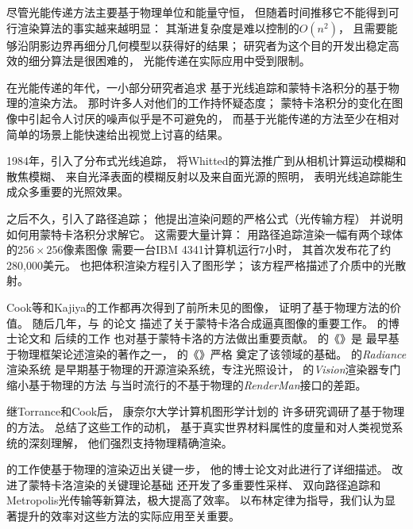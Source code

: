 尽管光能传递方法主要基于物理单位和能量守恒，
但随着时间推移它不能得到可行渲染算法的事实越来越明显：
其渐进复杂度是难以控制的$O(n^2)$，
且需要能够沿阴影边界再细分几何模型以获得好的结果；
研究者为这个目的开发出稳定高效的细分算法是很困难的，
光能传递在实际应用中受到限制。

在光能传递的年代，一小部分研究者追求
基于光线追踪和蒙特卡洛积分的基于物理的渲染方法。
那时许多人对他们的工作持怀疑态度；
蒙特卡洛积分的变化在图像中引起令人讨厌的噪声似乎是不可避免的，
而基于光能传递的方法至少在相对简单的场景上能快速给出视觉上讨喜的结果。

1984年，\citet{10.1145/800031.808590}引入了分布式光线追踪，
将Whitted的算法推广到从相机计算运动模糊和散焦模糊、
来自光泽表面的模糊反射以及来自面光源的照明，
表明光线追踪能生成众多重要的光照效果。

之后不久，\citet{10.1145/15922.15902}引入了路径追踪；
他提出渲染问题的严格公式（光传输方程）
并说明如何用蒙特卡洛积分求解它。
这需要大量计算：
用路径追踪渲染一幅有两个球体的$256\times256$像素图像
需要一台IBM 4341计算机运行7小时，
其首次发布花了约280,000美元\citep{farmer1981comparing}。
\citet{10.1145/800031.808594}
也把体积渲染方程引入了图形学；
该方程严格描述了介质中的光散射。

Cook等和Kajiya的工作都再次得到了前所未见的图像，
证明了基于物理方法的价值。
随后几年，\citet{10.1145/97879.97886}与
\citet{10.1145/122718.122735}的论文
描述了关于蒙特卡洛合成逼真图像的重要工作。
\citet{10.5555/124947}的博士论文和
后续\citet{10.1145/226150.226151}的工作
也对基于蒙特卡洛的方法做出重要贡献。
\citet{10.1007/978-1-4612-3526-2}的《》是
最早基于物理框架论述渲染的著作之一，
\citet{GLASSNER1995}的《》严格
奠定了该领域的基础。
\citet{10.1145/192161.192286}的\emph{Radiance}渲染系统
是早期基于物理的开源渲染系统，专注光照设计，
\citet{slusallek1996vision}的\emph{Vision}渲染器专门缩小基于物理的方法
与当时流行的不基于物理的\emph{RenderMan}接口的差距。

继Torrance和Cook后，
康奈尔大学计算机图形学计划的
许多研究调研了基于物理的方法。
\citet{10.1145/258734.258914}总结了这些工作的动机，
基于真实世界材料属性的度量和对人类视觉系统的深刻理解，
他们强烈支持物理精确渲染。

\citet{veach1997robust}的工作使基于物理的渲染迈出关键一步，
他的博士论文对此进行了详细描述。
\citeauthor{veach1997robust}改进了蒙特卡洛渲染的关键理论基础
还开发了多重要性采样、
双向路径追踪和Metropolis光传输等新算法，极大提高了效率。
以布林定律为指导，我们认为显著提升的效率对这些方法的实际应用至关重要。

